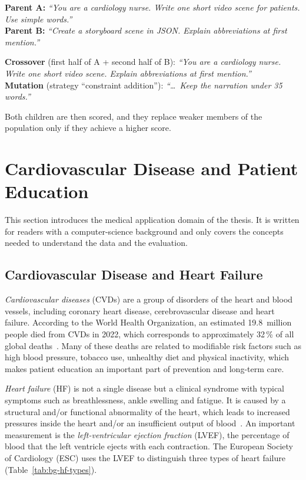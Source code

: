 \begin{bgexample}
\textbf{Parent A:} \emph{``You are a cardiology nurse. Write one short video
scene for patients. Use simple words.''}\\
\textbf{Parent B:} \emph{``Create a storyboard scene in JSON. Explain
abbreviations at first mention.''}\par\smallskip
\textbf{Crossover} (first half of A + second half of B):
\emph{``You are a cardiology nurse. Write one short video scene. Explain
abbreviations at first mention.''}\\
\textbf{Mutation} (strategy ``constraint addition''):
\emph{``\ldots\ Keep the narration under 35 words.''}\par\smallskip
Both children are then scored, and they replace weaker members of the
population only if they achieve a higher score.
\end{bgexample}

\section{Cardiovascular Disease and Patient Education}
\label{sec:bg-medical}

This section introduces the medical application domain of the thesis. It is
written for readers with a computer-science background and only covers the
concepts needed to understand the data and the evaluation.

\subsection{Cardiovascular Disease and Heart Failure}
\label{sec:bg-cvd}

\emph{Cardiovascular diseases} (CVDs) are a group of disorders of the heart
and blood vessels, including coronary heart disease, cerebrovascular
disease and heart failure. According to the World Health Organization, an
estimated 19.8~million people died from CVDs in 2022, which corresponds to
approximately 32\,\% of all global deaths~\cite{who2025cvd}. Many of these
deaths are related to modifiable risk factors such as high blood pressure,
tobacco use, unhealthy diet and physical inactivity, which makes patient
education an important part of prevention and long-term care.

\emph{Heart failure} (HF) is not a single disease but a clinical syndrome
with typical symptoms such as breathlessness, ankle swelling and fatigue. It is
caused by a structural and/or functional abnormality of the heart, which
leads to increased pressures inside the heart and/or an insufficient output of
blood~\cite{mcdonagh2021esc}.
An important measurement is the \emph{left-ventricular ejection fraction}
(LVEF), the percentage of blood that the left ventricle ejects with each
contraction. The European Society of Cardiology (ESC) uses the LVEF to
distinguish three types of heart failure (Table~\ref{tab:bg-hf-types}).

